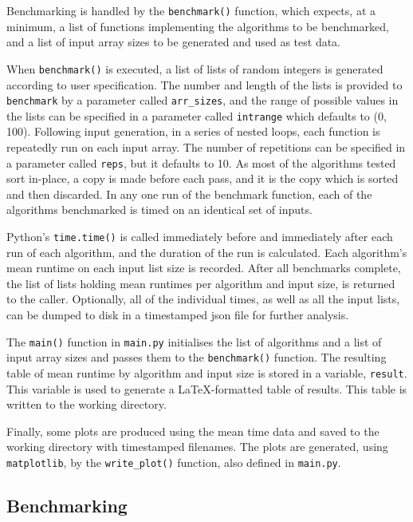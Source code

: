\documentclass[12pt, a4paper]{article}
\begin{document}
Benchmarking is handled by the \texttt{benchmark()} function, which expects, at a minimum, a list of functions implementing the algorithms to be benchmarked, and a list of input array sizes to be generated and used as test data.

When \texttt{benchmark()} is executed, a list of lists of random integers is generated according to user specification. The number and length of the lists is provided to \texttt{benchmark} by a parameter called \texttt{arr\_sizes}, and the range of possible values in the lists can be specified in a parameter called \texttt{intrange} which defaults to (0, 100). Following input generation, in a series of nested loops, each function is repeatedly run on each input array. The number of repetitions can be specified in a parameter called \texttt{reps}, but it defaults to 10. As most of the algorithms tested sort in-place, a copy is made before each pass, and it is the copy which is sorted and then discarded. In any one run of the benchmark function, each of the algorithms benchmarked is timed on an identical set of inputs.

Python's \texttt{time.time()} is called immediately before and immediately after each run of each algorithm, and the duration of the run is calculated. Each algorithm's mean runtime on each input list size is recorded. After all benchmarks complete, the list of lists holding mean runtimes per algorithm and input size, is returned to the caller. Optionally, all of the individual times, as well as all the input lists, can be dumped to disk in a timestamped json file for further analysis.

The \texttt{main()} function in \texttt{main.py} initialises the list of algorithms and a list of input array sizes and passes them to the \texttt{benchmark()} function. The resulting table of mean runtime by algorithm and input size is stored in a variable, \texttt{result}. This variable is used to generate a LaTeX-formatted table of results. This table is written to the working directory. 

Finally, some plots are produced using the mean time data and saved to the working directory with timestamped filenames. The plots are generated, using \texttt{matplotlib}, by the \texttt{write\_plot()} function, also defined in \texttt{main.py}.

\subsection{Benchmarking}
\end{document}
